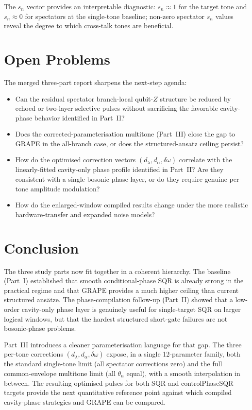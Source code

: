 \documentclass[11pt]{article}
\begin{document}
The $s_n$ vector provides an interpretable diagnostic: $s_n \approx 1$
for the target tone and $s_n \approx 0$ for spectators at the
single-tone baseline; non-zero spectator $s_n$ values reveal the degree
to which cross-talk tones are beneficial.

\section{Open Problems}

The merged three-part report sharpens the next-step agenda:
\begin{itemize}
    \item Can the residual spectator branch-local qubit-$Z$ structure be
    reduced by echoed or two-layer selective pulses without sacrificing the
    favorable cavity-phase behavior identified in Part~II?
    \item Does the corrected-parameterisation multitone (Part~III) close the
    gap to GRAPE in the all-branch case, or does the structured-ansatz ceiling
    persist?
    \item How do the optimised correction vectors $(d_\lambda, d_\alpha,
    \delta\omega)$ correlate with the linearly-fitted cavity-only phase profile
    identified in Part~II?  Are they consistent with a single bosonic-phase
    layer, or do they require genuine per-tone amplitude modulation?
    \item How do the enlarged-window compiled results change under the more
    realistic hardware-transfer and expanded noise models?
\end{itemize}

\section{Conclusion}

The three study parts now fit together in a coherent hierarchy.  The baseline
(Part~I) established that smooth conditional-phase SQR is already strong in the
practical regime and that GRAPE provides a much higher ceiling than current
structured ans\"atze.  The phase-compilation follow-up (Part~II) showed that a
low-order cavity-only phase layer is genuinely useful for single-target SQR on
larger logical windows, but that the hardest structured short-gate failures are
not bosonic-phase problems.

Part~III introduces a cleaner parameterisation language for that gap. The three
per-tone corrections $(d_\lambda, d_\alpha, \delta\omega)$ expose, in a
single 12-parameter family, both the standard single-tone limit (all spectator
corrections zero) and the full common-envelope multitone limit (all $\theta_n$
equal), with a smooth interpolation in between.  The resulting optimised pulses
for both SQR and controlPhaseSQR targets provide the next quantitative reference
point against which compiled cavity-phase strategies and GRAPE can be compared.
\end{document}
